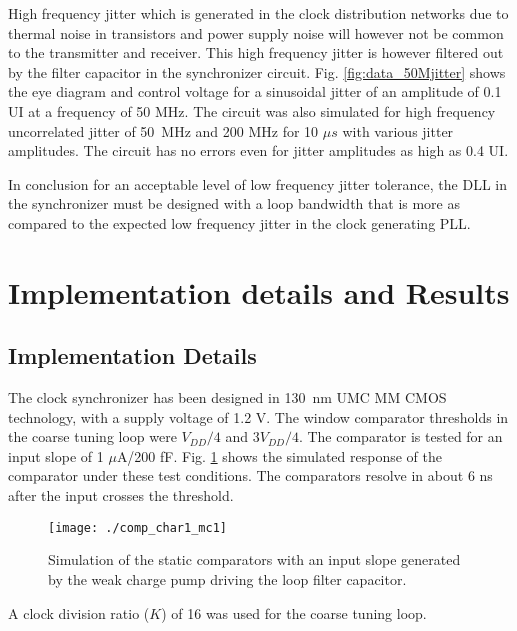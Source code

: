 \documentclass[journal,twoside,letterpaper]{IEEEtran}
\begin{document}
High frequency jitter which is generated in the clock distribution 
networks due to thermal noise in transistors and power supply noise
will however not be common to the transmitter and receiver. 
This high frequency jitter is however filtered out by the filter
capacitor in the synchronizer circuit. Fig. \ref{fig:data_50Mjitter} shows
the eye diagram and control voltage for a sinusoidal jitter of an amplitude 
of 0.1 UI at a frequency of 50 MHz. 
The circuit was also simulated for
high frequency uncorrelated jitter of \mbox{50 MHz} and 200 MHz 
for 10 $\mu s$ with various jitter amplitudes. 
The circuit has no errors even for jitter amplitudes 
as high as 0.4 UI.

In conclusion for an 
acceptable level of low frequency jitter tolerance, the DLL in the 
synchronizer must be designed with a loop bandwidth that is 
more as compared to the expected low frequency jitter 
in the clock generating PLL.

\section{Implementation details and Results}
\label{sec:implementation}
\subsection{Implementation Details}
The clock synchronizer has been designed in \mbox{130 nm} UMC MM CMOS technology,
with a supply voltage of 1.2 V.
The window comparator thresholds in the coarse tuning loop
were $V_{DD}/4$ and $3V_{DD}/4$. The comparator is tested for an input 
slope of 1 $\mu$A/200 fF.
Fig. \ref{fig:static_comp} shows the simulated response of the comparator 
under these test conditions. The comparators
resolve in about 6 ns after the input crosses the threshold.
\begin{figure}[h!]
\centering
\texttt{[image: ./comp\_char1\_mc1]}
\caption{Simulation of the static comparators with an input
slope generated by the weak charge pump driving the loop filter capacitor.}
\label{fig:static_comp}
\end{figure}
A clock division ratio ($K$) of 16 
was used for the coarse tuning loop.
\end{document}
